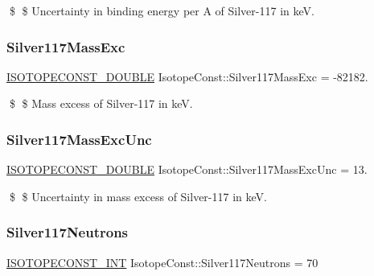 \$ \$ Uncertainty in binding energy per A of Silver-\/117 in keV. \mbox{\label{group___isotope_const-_silver-_ag117_gaa6eda562f8e6b817853c9b09aa3ece29}} 
\subsubsection{\texorpdfstring{Silver117\+Mass\+Exc}{Silver117MassExc}}
{\footnotesize\ttfamily \mbox{\hyperlink{group___isotope_const-_macros_ga8f45a7272ce02c0b4c65c44636ed719a}{I\+S\+O\+T\+O\+P\+E\+C\+O\+N\+S\+T\+\_\+\+D\+O\+U\+B\+LE}} Isotope\+Const\+::\+Silver117\+Mass\+Exc = -\/82182.}

\$ \$ Mass excess of Silver-\/117 in keV. \mbox{\label{group___isotope_const-_silver-_ag117_ga45f99a708e8ebe9b740668ed630d2166}} 
\subsubsection{\texorpdfstring{Silver117\+Mass\+Exc\+Unc}{Silver117MassExcUnc}}
{\footnotesize\ttfamily \mbox{\hyperlink{group___isotope_const-_macros_ga8f45a7272ce02c0b4c65c44636ed719a}{I\+S\+O\+T\+O\+P\+E\+C\+O\+N\+S\+T\+\_\+\+D\+O\+U\+B\+LE}} Isotope\+Const\+::\+Silver117\+Mass\+Exc\+Unc = 13.}

\$ \$ Uncertainty in mass excess of Silver-\/117 in keV. \mbox{\label{group___isotope_const-_silver-_ag117_gae04a03564a0e2c5f1978a639260d0601}} 
\subsubsection{\texorpdfstring{Silver117\+Neutrons}{Silver117Neutrons}}
{\footnotesize\ttfamily \mbox{\hyperlink{group___isotope_const-_macros_ga5f18360b3e99483a35c32d789e62621c}{I\+S\+O\+T\+O\+P\+E\+C\+O\+N\+S\+T\+\_\+\+I\+NT}} Isotope\+Const\+::\+Silver117\+Neutrons = 70}

